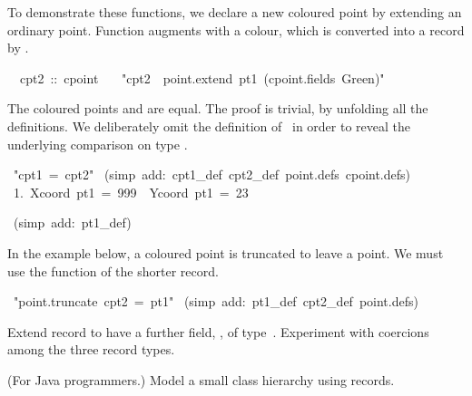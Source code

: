 To demonstrate these functions, we declare a new coloured point by extending
an ordinary point.  Function  augments  with a
colour, which is converted into a record by .
\begin{isabelle}
\isanewline
\ \ cpt2\ ::\ cpoint\isanewline
\ \ \ "cpt2\ \isasymequiv\ point.extend\ pt1\ (cpoint.fields\ Green)"\isamarkupfalse%
\end{isabelle}

The coloured points  and  are equal.  The proof is
trivial, by unfolding all the definitions.  We deliberately omit the
definition of~ in order to reveal the underlying comparison on type
. 
\begin{isabelle}
\ "cpt1\ =\ cpt2"\isanewline
{}\ (simp\ add:\ cpt1_def\ cpt2_def\ point.defs\ cpoint.defs)\isanewline
\ 1.\ Xcoord\ pt1\ =\ 999\ \isasymand \ Ycoord\ pt1\ =\ 23
\par\smallskip
{}\ (simp\ add:\ pt1_def)
\end{isabelle}

In the example below, a coloured point is truncated to leave a point.  
We must use the  function of the shorter record.
\begin{isabelle}
\ "point.truncate\ cpt2\ =\ pt1"\isanewline
{}\ (simp\ add:\ pt1_def\ cpt2_def\ point.defs)
\end{isabelle}

\begin{exercise}
Extend record  to have a further field, , of
type~.  Experiment with coercions among the three record types.
\end{exercise}

\begin{exercise}
(For Java programmers.)  
Model a small class hierarchy using records.
\end{exercise}

\endinput

